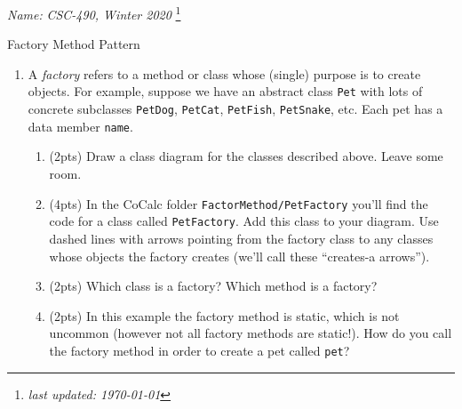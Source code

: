 \documentclass[11pt]{article}
\newlength{\up}\setlength{\up}{-\baselineskip}
\newcommand\blfootnote[1]{%
  \begingroup
  \renewcommand\thefootnote{}\footnote{#1}%
  \addtocounter{footnote}{-1}%
  \endgroup
}
\begin{document}
\noindent\emph{Name:}
\hfill
\emph{CSC-490, Winter 2020}
\blfootnote{\emph{last updated: \today}}

\vspace{-0.4in}

\begin{center}
  {\huge Factory Method Pattern}
\end{center}

\medskip




\begin{enumerate}

  \item  A \emph{factory} refers to a method or class whose (single) purpose is to create objects. 
  For example, suppose we have an abstract class \texttt{Pet} with lots of concrete subclasses \texttt{PetDog}, \texttt{PetCat}, \texttt{PetFish}, \texttt{PetSnake}, etc. Each pet has a data member \texttt{name}.

  \begin{enumerate}

    \item (2pts) Draw a class diagram for the classes described above. Leave some room.
    \item (4pts) In the CoCalc folder \texttt{FactorMethod/PetFactory} you'll find the code for a class called \texttt{PetFactory}. Add this class to your diagram. Use dashed lines with arrows pointing from the factory class to any classes whose objects the factory creates (we'll call these ``creates-a arrows'').

    \vfill

    \item (2pts) Which class is a factory? Which method is a factory?

    \vspace{0.5in}

    \item (2pts) In this example the factory method is static, which is not uncommon (however not all factory methods are static!). How do you call the factory method in order to create a pet called \texttt{pet}?

    \vspace{0.5in}

  \end{enumerate}


\end{enumerate}
\end{document}
